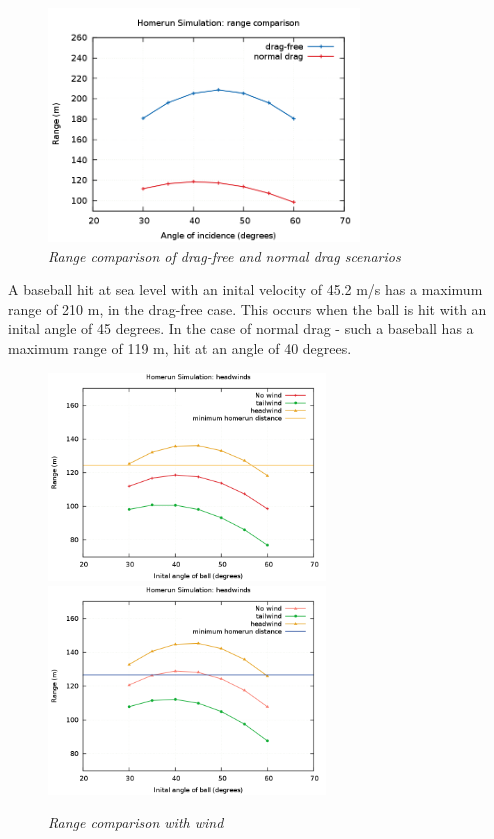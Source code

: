 \documentclass[11pt]{article}
\begin{document}
\begin{figure}[H]
  \begin{center}
\centerline{\includegraphics[width=3.25in]{rangevsangle.png}}
\caption{\it \small{Range comparison of drag-free and normal drag scenarios \label{fig3}}}
  \end{center}
\end{figure}
A baseball hit at sea level with an inital velocity of 45.2 m/s has a maximum range of 210 m, in the drag-free case.  This occurs 
when the ball is hit with an inital angle of 45 degrees.  
In the case of normal drag - such a baseball has a maximum range of 119 m, hit at an angle of 40 degrees.
\begin{figure}[H]
 \centerline{\includegraphics[width=2.9in]{rangeNY.png}\includegraphics[width=2.9in]{rangedenver.png}}
\caption{\it \small{Range comparison with wind \label{fig4}}}
\end{figure}
\end{document}
